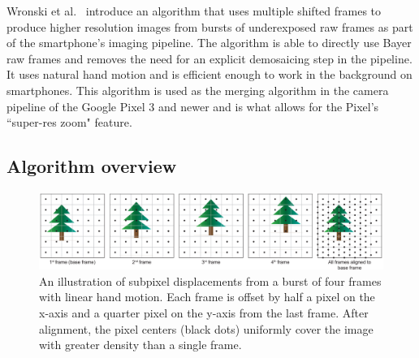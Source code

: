 \documentclass{sig-alternate}
\begin{document}


Wronski et al.~\cite{Wronski2019} introduce an algorithm that uses multiple shifted frames to produce higher resolution images from bursts of underexposed raw frames as part of the smartphone's imaging pipeline. The algorithm is able to directly use Bayer raw frames and removes the need for an explicit demosaicing step in the pipeline. It uses natural hand motion and is efficient enough to work in the background on smartphones. This algorithm is used as the merging algorithm in the camera pipeline of the Google Pixel 3 and newer and is what allows for the Pixel's ``super-res zoom" feature.

\subsection{Algorithm overview}

\begin{figure}
\centering
\includegraphics[width=42pc]{Wronski2019-figure-4}
\caption{An illustration of subpixel displacements from a burst of four frames with linear hand motion. Each frame is offset by half a pixel on the x-axis and a quarter pixel on the y-axis from the last frame. After alignment, the pixel centers (black dots) uniformly cover the image with greater density than a single frame.~\cite{Wronski2019}}
\label{fig:Wronski2019Fig4}



\end{figure}

\end{document}
